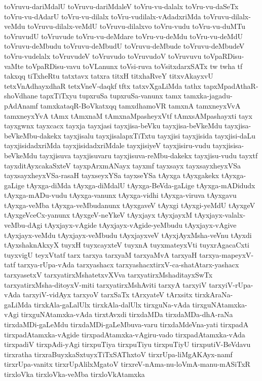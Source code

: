 {toVruvu-dariMdalU
toVruvu-dariMdaleV
toVru-vu-dalalx
toVru-vu-daSeTx
toVru-vu-dAdarU
toVru-vu-dilalx
toVru-vudilalx-vAdadxriMda
toVruvu-dilalx-veMdu
toVruvu-dilalx-veMdU
toVruvu-dilalxvo
toVru-vudu
toVru-vu-duMTu
toVruvudU
toVruvude
toVru-vu-deMdare
toVru-vu-deMdu
toVru-vu-deMdU
toVruvu-deMbudu
toVruvu-deMbudU
toVruvu-deMbude
toVruvu-deMbudeV
toVru-vudelalx
toVruvudeV
toVruvudo
toVruvudoV
toVruvuvu
toVpaRDisu-vaMte
toVpaRDisu-vavu
toVLanunx
toVsi-ruva
toVsitxdarxSATx
tw
twha
tf
takxqq
tiTxheRtu
tatxtavx
tatxra
titxH
titxhaRveY
titxvAkayxvU
tetxVnAdhayxdhaR
tetxVneV-daqkf
tftx
tatxvXgaLiMda
tathx
tapxMpadAthaR-shoVdhane
tapxTiTxyu
tupxruSa
tupxruSa-vanunx
tamx
tamxka-jagadu-pAdAnamf
tamxkataqR-BoVkatxqq
tamxdhamoVR
tamxnA
tamxneyxVvA
tamxneyxYvA
tAmx
tAmxnaM
tAmxnaMpasheyxVtf
tAmxsAMpashayxti
tayx
tayxgwnx
tayxcacx
tayxja
tayxjasi
tayxjisa-beVku
tayxjisa-beVkeMdu
tayxjisa-beVkeMbu-dakekx
tayxjisalu
tayxjisalapxTiTxtu
tayxjisi
tayxjisida
tayxjisi-daLu
tayxjisidadxriMda
tayxjisidadxriMdale
tayxjisiyeV
tayxjisiru-vudu
tayxjisisa-beVkeMdu
tayxjisuva
tayxjisuvaru
tayxjisuva-reMbu-dakekx
tayxjisu-vudu
tayxtf
tayxditAyxcakaSxteV
tayxpArxmANayx
tayxmf
tayxsayx
tayxsayxheyxVSa
tayxsayxheyxVSa-rasaH
tayxseyxYSa
tayxseYSa
tAyxga
tAyxgakekx
tAyxga-gaLige
tAyxga-diMda
tAyxga-diMdalU
tAyxga-BeVda-gaLige
tAyxga-mADidudx
tAyxga-mADu-vudu
tAyxga-vanunx
tAyxga-vidhi
tAyxga-viruva
tAyxgavu
tAyxga-veMba
tAyxga-veMbudanunx
tAyxgaveV
tAyxgi
tAyxgi-yeMdU
tAyxgeV
tAyxgeVceCx-yanunx
tAyxgeV-neYkeV
tAyxjayx
tAyxjayxM
tAyxjayx-valalx-veMbu-dAgi
tAyxjayx-vAgide
tAyxjayx-vAgide-yeMbudu
tAyxjayx-vAgive
tAyxjayx-veMdu
tAyxjayx-veMbudu
tAyxjayxveV
tAyxjAyxMsha-veVnu
tAyxdi
tAyxshaknAkxyX
tuyxH
tuyxcayxteV
tuyxnA
tuyxmateyxVti
tuyxrAgacaCxti
tuyxvigU
teyxVtatf
tarx
tarxya
tarxyaM
tarxyaMvA
tarxyaH
tarxya-mapeyxV-tatf
tarxya-rUpa-vAda
tarxyashacx
tarxyashacxtirxV-ca-shatAtarx-yashacx
tarxyasetxV
tarxyatirxMshatetxvXVva
tarxyatirxMshaditayxSwTx
tarxyatirxMsha-ditoyxV-miti
tarxyatirxMshAviti
tarxyA
tarxyiV
tarxyiV-rUpa-vAda
tarxyiV-vidAyx
tarxyoV
tarxSaTx
tArxyateV
tArxsitx
tirxkAraNa-gaLiMda
tirxkAla-gaLalUlx
tirxkAla-dalUlx
tirxguNa-vAda
tirxguNAtamxka-vAgi
tirxguNAtamxka-vAda
tirxtAvxdi
tirxdaMDa
tirxdaMDa-dhA-raNa
tirxdaMDi-gaLeMdu
tirxdaMDi-gaLeMbuva-varu
tirxdaMdeVna-yati
tirxpadA
tirxpadAtamxka-vAgide
tirxpadAtamxka-vAgiru-vado
tirxpadAtamxka-vAda
tirxpadiV
tirxpAdi-yAgi
tirxpuTiya
tirxpuTiyu
tirxpuTiyU
tirxputiV-BeVdavu
tirxratha
tirxraBuyxkaSxtuyxTiTxSAThxtoV
tirxrUpa-liMgAKAyx-namf
tirxrUpa-vanitx
tirxrUpAlilxMgatoV
tirxreV-nAma-nu-loVmA-manu-mASiTxR
tirxloVka
tirxloVka-veMba
tirxloVkAtamxka
}
